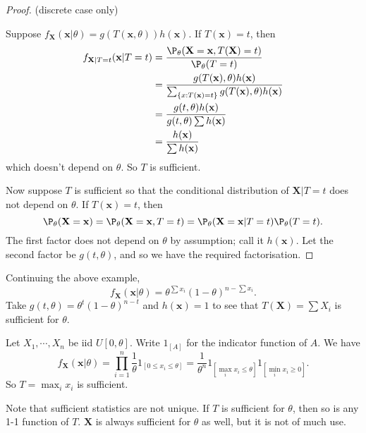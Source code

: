 \documentclass[a4paper]{article}
\begin{document}
\begin{proof}
  (discrete case only)

  Suppose $f_\mathbf{X}(\mathbf{x}|\theta) = g(T(\mathbf{x}, \theta))h(\mathbf{x})$. If $T(\mathbf{x}) = t$, then
  \begin{align*}
    f_{\mathbf{X}|T = t}(\mathbf{x}|T = t) &= \frac{\P_\theta(\mathbf{X} = \mathbf{x}, T(\mathbf{X}) = t)}{\P_\theta (T = t)}\\
    &= \frac{g(T(\mathbf{x}), \theta)h(\mathbf{x})}{\sum_{\{x:T(\mathbf{x}) = t\}}g(T(\mathbf{x}), \theta)h(\mathbf{x})}\\
    &=\frac{g(t, \theta)h(\mathbf{x})}{g(t, \theta)\sum h(\mathbf{x})}\\
    &= \frac{h(\mathbf{x})}{\sum h(\mathbf{x})}
  \end{align*}
  which doesn't depend on $\theta$. So $T$ is sufficient.

  Now suppose $T$ is sufficient so that the conditional distribution of $\mathbf{X}|T = t$ does not depend on $\theta$. If $T(\mathbf{x}) = t$, then
  \[
    \P_\theta(\mathbf{X} = \mathbf{x}) = \P_\theta(\mathbf{X} = \mathbf{x}, T=t) = \P_\theta(\mathbf{X} = \mathbf{x}|T = t)\P_\theta (T = t).
  \]
  The first factor does not depend on $\theta$ by assumption; call it $h(\mathbf{x})$. Let the second factor be $g(t, \theta)$, and so we have the required factorisation.
\end{proof}

\begin{eg}
  Continuing the above example,
  \[
    f_\mathbf{X}(\mathbf{x}|\theta) = \theta^{\sum x_i}(1 - \theta)^{n - \sum x_i}.
  \]
  Take $g(t, \theta) = \theta^t(1 - \theta)^{n - t}$ and $h(\mathbf{x}) = 1$ to see that $T(\mathbf{X}) = \sum X_i$ is sufficient for $\theta$.
\end{eg}

\begin{eg}
  Let $X_1, \cdots, X_n$ be iid $U[0, \theta]$. Write $1_{[A]}$ for the indicator function of $A$. We have
  \[
    f_\mathbf{X}(\mathbf{x}|\theta) = \prod_{i = 1}^n \frac{1}{\theta}1_{[0 \leq x_i\leq \theta]} = \frac{1}{\theta^n}1_{[\max_i x_i \leq \theta]}1_{[\min_i x_i\geq 0]}.
  \]
  So $T = \max_i x_i$ is sufficient.
\end{eg}

Note that sufficient statistics are not unique. If $T$ is sufficient for $\theta$, then so is any 1-1 function of $T$. $\mathbf{X}$ is always sufficient for $\theta$ as well, but it is not of much use.
\end{document}
